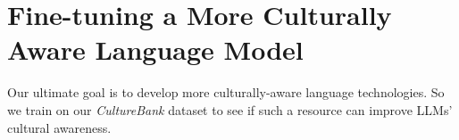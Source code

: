 \documentclass{article} %
\newcommand{\wyshi}[1]{\textcolor{red}{[#1 --Weiyan]}}
\newcommand{\ryan}[1]{\textcolor{magenta}{[#1 --Ryan]}}
\newcommand{\dataname}{\textit{CultureBank}\xspace}
\begin{document}




\vspace{-1em}
\section{Fine-tuning a More Culturally Aware Language Model}
\label{sec:fine-tuning}
Our ultimate goal is to develop more culturally-aware language technologies. So we train on our \dataname dataset to see if such a resource can improve LLMs' cultural awareness. 
\end{document}

